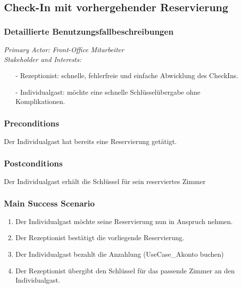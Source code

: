 \documentclass[./detailed_overview_usecases.tex]{subfiles}
\begin{document}
    \subsection{Check-In mit vorhergehender Reservierung}
    \subsubsection{Detaillierte Benutzungsfallbeschreibungen}
    \textit{Primary Actor: Front-Office Mitarbeiter}
    \\
    \textit{Stakeholder and Interests:}
    \begin{itemize}
        \item[-] Rezeptionist: schnelle, fehlerfreie und einfache Abwicklung des CheckIns.
        \item[-] Individualgast: möchte eine schnelle Schlüsselübergabe ohne Komplikationen.
    \end{itemize}

    \subsubsection*{Preconditions}
    Der Individualgast hat bereits eine Reservierung getätigt.
    \subsubsection*{Postconditions}
    Der Individualgast erhält die Schlüssel für sein reserviertes Zimmer

    \subsubsection*{Main Success Scenario}
    \begin{enumerate}
        \item Der Individualgast möchte seine Reservierung nun in Anspruch nehmen.
        \item Der Rezeptionist bestätigt die vorliegende Reservierung.
        \item Der Individualgast bezahlt die Anzahlung (UseCase_Akonto buchen)
        \item Der Rezeptionist übergibt den Schlüssel für das passende Zimmer an den Individualgast.
    \end{enumerate}
\end{document}
